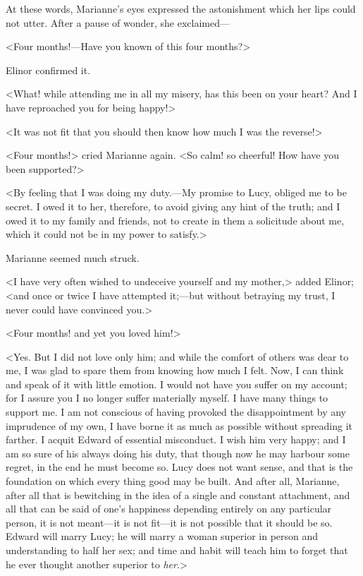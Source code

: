 At these words, Marianne's eyes expressed the astonishment which her lips could not utter. After a pause of wonder, she exclaimed—

<Four months!—Have you known of this four months?>

Elinor confirmed it.

<What! while attending me in all my misery, has this been on your heart? And I have reproached you for being happy!>

<It was not fit that you should then know how much I was the reverse!>

<Four months!> cried Marianne again. <So calm! so cheerful! How have you been supported?>

<By feeling that I was doing my duty.—My promise to Lucy, obliged me to be secret. I owed it to her, therefore, to avoid giving any hint of the truth; and I owed it to my family and friends, not to create in them a solicitude about me, which it could not be in my power to satisfy.>

Marianne seemed much struck.

<I have very often wished to undeceive yourself and my mother,> added Elinor; <and once or twice I have attempted it;—but without betraying my trust, I never could have convinced you.>

<Four months! and yet you loved him!>

<Yes. But I did not love only him; and while the comfort of others was dear to me, I was glad to spare them from knowing how much I felt. Now, I can think and speak of it with little emotion. I would not have you suffer on my account; for I assure you I no longer suffer materially myself. I have many things to support me. I am not conscious of having provoked the disappointment by any imprudence of my own, I have borne it as much as possible without spreading it farther. I acquit Edward of essential misconduct. I wish him very happy; and I am so sure of his always doing his duty, that though now he may harbour some regret, in the end he must become so. Lucy does not want sense, and that is the foundation on which every thing good may be built. And after all, Marianne, after all that is bewitching in the idea of a single and constant attachment, and all that can be said of one's happiness depending entirely on any particular person, it is not meant—it is not fit—it is not possible that it should be so. Edward will marry Lucy; he will marry a woman superior in person and understanding to half her sex; and time and habit will teach him to forget that he ever thought another superior to \textit{her}.>

